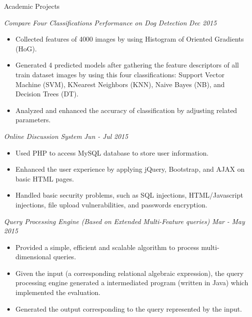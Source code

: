 \documentclass{resume} 		%
\begin{document}
\begin{rSection}{Academic Projects}

{\sl Compare Four Classifications Performance on Dog Detection} \hfill {\em Dec 2015} 
\begin{itemize}   				
 \setlength\itemsep{-0.5em}		%
 \renewcommand\labelitemi{--}		%
\item Collected features of 4000 images by using Histogram of Oriented Gradients (HoG).
\item Generated 4 predicted models after gathering the feature descriptors of all train dataset images by using this four classifications: Support Vector Machine (SVM), K­\-Nearest Neighbors (KNN), Naive Bayes (NB), and Decision Trees (DT). 
\item  Analyzed and enhanced the accuracy of classification by adjusting related parameters.
\end{itemize}
{\sl Online Discussion System} \hfill {\em Jun - Jul 2015} 
\begin{itemize}   				
 \setlength\itemsep{-0.5em}		%
 \renewcommand\labelitemi{--}		%
\item Used PHP to access MySQL database to store user information.
\item Enhanced the user experience by applying jQuery, Bootstrap, and AJAX on basic HTML pages. 
\item Handled basic security problems, such as SQL injections, HTML/Javascript injections, file upload vulnerabilities, and passwords encryption. 
\end{itemize}
{\sl Query Processing Engine (Based on Extended Multi-Feature queries)} \hfill {\em Mar - May 2015} 
\begin{itemize}  
 \setlength\itemsep{-0.5em}		%
 \renewcommand\labelitemi{--}		%
\item Provided a simple, efficient and scalable algorithm to process multi-dimensional queries.
\item Given the input (a corresponding relational algebraic expression), the query processing engine generated a
intermediated program (written in Java) which implemented the evaluation. 
\item Generated the output corresponding to the query represented by the input.

\end{itemize}
\end{rSection}
\end{document}
